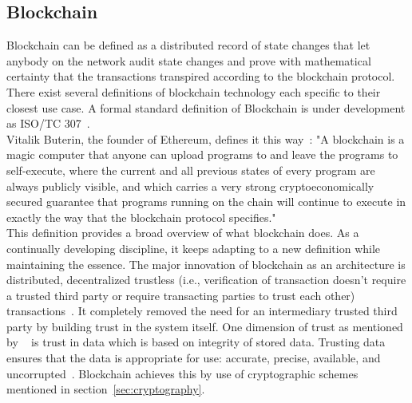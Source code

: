 \subsection{Blockchain}
Blockchain can be defined as a distributed record of state changes that let
anybody on the network audit state changes and prove with mathematical
certainty that the transactions transpired according to the blockchain
protocol. There exist several definitions of blockchain technology each
specific to their closest use case. A formal standard definition of Blockchain
is under development as ISO/TC 307~\cite{ISOTC307}.\\
Vitalik Buterin, the founder of Ethereum, defines it this
way~\cite{VitalikVisions}: "A blockchain is a magic computer that anyone can
upload programs to and leave the programs to self-execute, where the current
and all previous states of every program are always publicly visible, and which
carries a very strong cryptoeconomically secured guarantee that programs
running on the chain will continue to execute in exactly the way that the
blockchain protocol specifies."\\
This definition provides a broad overview of what blockchain does. As a
continually developing discipline, it keeps adapting to a new definition while
maintaining the essence. The major innovation of blockchain as an architecture
is distributed, decentralized trustless (i.e., verification of transaction
doesn't require a trusted third party or require transacting parties to trust
each other) transactions~\cite{Bitcoin_Satoshi}. It completely removed the need
for an intermediary trusted third party by building trust in the system itself.
One dimension of trust as mentioned by ~\cite{miller2010trust} is trust in data
which is based on integrity of stored data.  Trusting data ensures that the
data is appropriate for use: accurate, precise, available, and
uncorrupted~\cite{miller2010trust}.  Blockchain achieves this by use of
cryptographic schemes mentioned in section~\ref{sec:cryptography}.
\newpage


